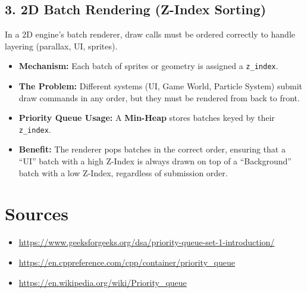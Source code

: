 \documentclass[11pt]{article}
\begin{document}
\subsection{3. 2D Batch Rendering (Z-Index Sorting)}
\label{sec:orgd227b7b}
In a 2D engine's batch renderer, draw calls must be ordered correctly to handle layering (parallax, UI, sprites).
\begin{itemize}
\item \textbf{Mechanism:} Each batch of sprites or geometry is assigned a \texttt{z\_index}.
\item \textbf{The Problem:} Different systems (UI, Game World, Particle System) submit draw commands in any order, but they must be rendered from back to front.
\item \textbf{Priority Queue Usage:} A \textbf{Min-Heap} stores batches keyed by their \texttt{z\_index}.
\item \textbf{Benefit:} The renderer pops batches in the correct order, ensuring that a ``UI'' batch with a high Z-Index is always drawn on top of a ``Background'' batch with a low Z-Index, regardless of submission order.
\end{itemize}

\newpage
\section{Sources}
\label{sec:orgdcf2ab2}
\begin{itemize}
\item \url{https://www.geeksforgeeks.org/dsa/priority-queue-set-1-introduction/}
\item \url{https://en.cppreference.com/cpp/container/priority\_queue}
\item \url{https://en.wikipedia.org/wiki/Priority\_queue}
\end{itemize}
\end{document}
